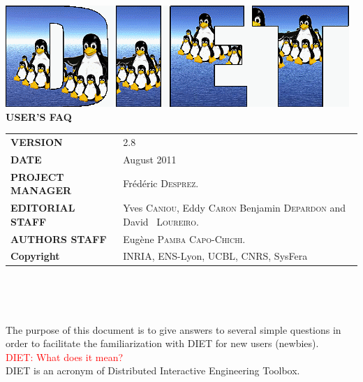 \documentclass[12pt,a4paper]{book}
\newcommand{\dietversion}{2.8}
\begin{document}

\thispagestyle{empty}
\vspace*{3cm}
\vspace*{3cm}

\begin{center}
\includegraphics[scale=.5]{fig/logo_DIET_big}\\[2ex]
\textbf{\Huge USER'S FAQ\\[2ex]}
\end{center}

\vfill

\noindent
\small{
\begin{tabular}{ll}
  \textbf{VERSION}  & \dietversion\\
  \textbf{DATE}     & August 2011\\
  \textbf{PROJECT MANAGER}  & Fr\'ed\'eric \textsc{Desprez}.\\
  \textbf{EDITORIAL STAFF}  & Yves \textsc{Caniou}, Eddy
  \textsc{Caron} Benjamin \textsc{Depardon} and David ~\textsc{Loureiro}.\\
  \textbf{AUTHORS STAFF}    & 
\begin{minipage}[t]{12cm}
  Eug\`ene \textsc{Pamba Capo-Chichi}.
\end{minipage} \\
  \textbf{Copyright}& INRIA, ENS-Lyon, UCBL, CNRS, SysFera
\end{tabular}\\
}

\newpage
\thispagestyle{empty}
\ 



\newpage
\tableofcontents

\setlength{\columnseprule}{1pt}


\noindent The purpose of this document is to give answers to several simple questions in order to facilitate the familiarization with DIET for new users (newbies).\\

\noindent \textcolor{red}{DIET: What does it mean?}\\
DIET is an acronym of Distributed Interactive Engineering Toolbox.\\
\end{document}
